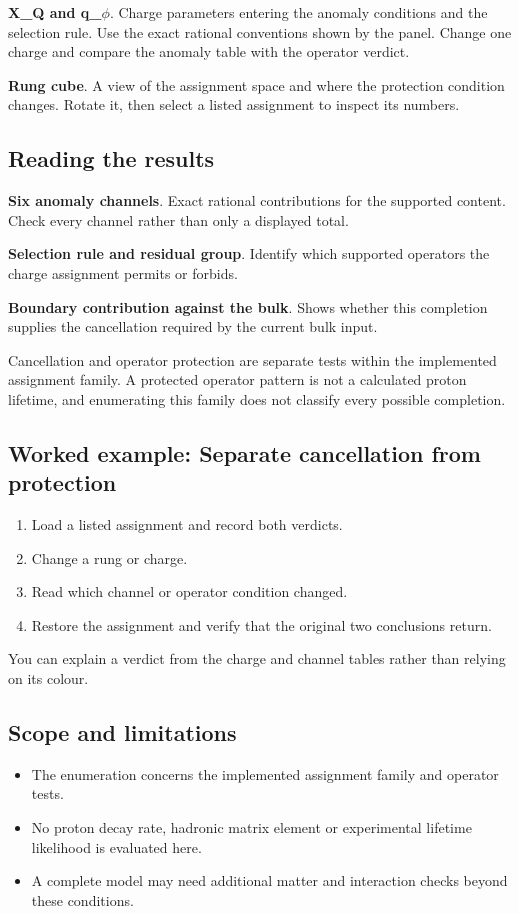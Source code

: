 \documentclass[11pt,a4paper]{article}
\begin{document}
\textbf{X\_Q and q\_\ensuremath{\phi}}. Charge parameters entering the anomaly conditions and the selection rule. Use the exact rational conventions shown by the panel. Change one charge and compare the anomaly table with the operator verdict.

\textbf{Rung cube}. A view of the assignment space and where the protection condition changes. Rotate it, then select a listed assignment to inspect its numbers.

\subsection*{Reading the results}
\textbf{Six anomaly channels}. Exact rational contributions for the supported content. Check every channel rather than only a displayed total.

\textbf{Selection rule and residual group}. Identify which supported operators the charge assignment permits or forbids.

\textbf{Boundary contribution against the bulk}. Shows whether this completion supplies the cancellation required by the current bulk input.

Cancellation and operator protection are separate tests within the implemented assignment family. A protected operator pattern is not a calculated proton lifetime, and enumerating this family does not classify every possible completion.
\subsection*{Worked example: Separate cancellation from protection}
\begin{enumerate}
\item Load a listed assignment and record both verdicts.
\item Change a rung or charge.
\item Read which channel or operator condition changed.
\item Restore the assignment and verify that the original two conclusions return.
\end{enumerate}
You can explain a verdict from the charge and channel tables rather than relying on its colour.
\subsection*{Scope and limitations}
\begin{itemize}
\item The enumeration concerns the implemented assignment family and operator tests.
\item No proton decay rate, hadronic matrix element or experimental lifetime likelihood is evaluated here.
\item A complete model may need additional matter and interaction checks beyond these conditions.
\end{itemize}
\end{document}
